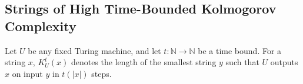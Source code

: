 


\subsection{Strings of High Time-Bounded Kolmogorov Complexity}

\begin{definition}
Let $U$ be any fixed Turing machine, and let $t: \mathbb{N} \rightarrow \mathbb{N}$ be a time bound. For a string $x$, $K_U^t(x)$ denotes the length of the smallest string $y$ such that $U$ outputs $x$ on input $y$ in $t(|x|)$ steps.
\end{definition}


